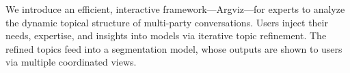 We introduce an efficient, interactive framework—Argviz—for experts to analyze the dynamic topical structure of multi-party conversations. Users
 inject their needs, expertise, and insights into models via iterative topic
 refinement. The refined topics feed into a segmentation model, whose outputs
 are shown to users via multiple coordinated views.

